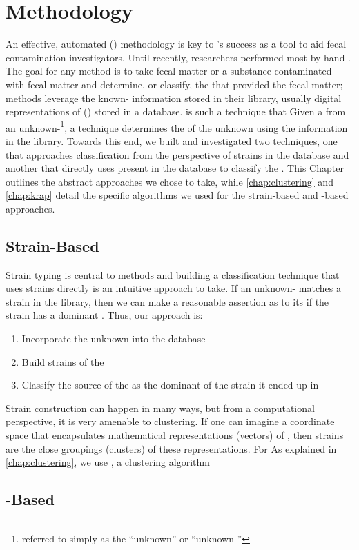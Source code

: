 \chapter{\MSTlong{} Methodology}\label{chap:methodology}
An effective, automated \mstlong{} (\mst{}) methodology is key to \cplop{}'s success as a tool to aid fecal contamination investigators.
Until recently, \cp{} researchers performed most \mst{} by hand \cite{moritz2015application, shapiro2015source}.
The goal for any \mst{} method is to take fecal matter or a substance contaminated with fecal matter and determine, or classify, the \spec{} that provided the fecal matter; \libdep{} \mst{} methods leverage the known-\spec{} information stored in their library, usually digital representations of \fiblong{} (\fib{}) stored in a database.
\cplop{} is such a \libdep{} technique that 
Given a \fib{} \isol{} from an unknown-\spec{}\footnote{referred to simply as the ``unknown'' or ``unknown \isol{}''}, a \libdep{} \mst{} technique determines the \spec{} of the unknown using the information in the library.
Towards this end, we built and investigated two \mst{} techniques, one that approaches \spec{} classification from the perspective of strains in the database and another that directly uses \isols{} present in the database to classify the \spec{}.
This Chapter outlines the abstract approaches we chose to take, while \autoref{chap:clustering} and \autoref{chap:krap} detail the specific algorithms we used for the strain-based and \isol{}-based approaches.

\section{Strain-Based}
Strain typing is central to \libdep{} \mst{} methods and building a \spec{} classification technique that uses strains directly is an intuitive approach to take.
If an unknown-\spec{} matches a strain in the library, then we can make a reasonable assertion as to its \spec{} if the strain has a dominant \spec{}.
Thus, our approach is: 
\begin{enumerate}
    \item Incorporate the unknown \fib{} \isol{} into the database
    \item Build strains of the \fib{} \isols{}
    \item Classify the source \spec{} of the \isol{} as the dominant \spec{} of the strain it ended up in
\end{enumerate}
Strain construction can happen in many ways, but from a computational perspective, it is very amenable to clustering.
If one can imagine a coordinate space that encapsulates mathematical representations (vectors) of \fib{} \isols{}, then strains are the close groupings (clusters) of these \isol{} representations.
For \cplop{}
As explained in \autoref{chap:clustering}, we use \dbscan{}, a \dbased{} clustering algorithm 

\section{\Isol{}-Based}